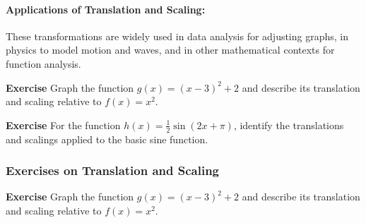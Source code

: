 \documentclass[a4paper,12pt]{book}
\newenvironment{exercise}[1][]
  {\par\medskip\noindent\textbf{Exercise #1} \rmfamily}
  {\medskip}
\begin{document}


\paragraph{Applications of Translation and Scaling:}
These transformations are widely used in data analysis for adjusting graphs, in physics to model motion and waves, and in other mathematical contexts for function analysis.

\begin{exercise}
Graph the function \( g(x) = (x - 3)^2 + 2 \) and describe its translation and scaling relative to \( f(x) = x^2 \).
\end{exercise}

\begin{exercise}
For the function \( h(x) = \frac{1}{2}\sin(2x + \pi) \), identify the translations and scalings applied to the basic sine function.
\end{exercise}

\subsubsection*{Exercises on Translation and Scaling}

\begin{exercise}
Graph the function \( g(x) = (x - 3)^2 + 2 \) and describe its translation and scaling relative to \( f(x) = x^2 \).
\end{exercise}
\end{document}
